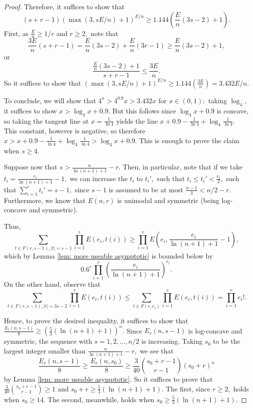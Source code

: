\documentclass{article}
\theoremstyle{definition}
\theoremstyle{remark}
\begin{document}
\begin{proof}
\par Therefore, it suffices to show that \[(s+r-1)(\max(3, sE/n) + 1)^{E/n} \geq 1.144 (\frac{E}{n}(3s - 2) + 1).\] First, as $\frac{E}{n} \geq 1/r$ and $r \geq 2,$ note that \[\frac{3E}{n}(s+r-1) = \frac{E}{n}(3s - 2) + \frac{E}{n}(3r - 1) \geq \frac{E}{n}(3s - 2) + 1,\] or $$\frac{\frac{E}{n}(3s - 2) + 1}{s + r - 1} \leq \frac{3E}{n}.$$ So it suffices to show that $(\max(3, sE/n) + 1)^{E/n} \geq 1.144(\frac{3E}{n}) = 3.432E/n.$ 
\par To conclude, we will show that $4^x > 4^{0.9}x > 3.432x$ for $x \in (0, 1):$ taking $\log_4,$ it suffices to show $x > \log_4 x + 0.9.$ But this follows since $\log_4 x + 0.9$ is concave, so taking the tangent line at $x = \frac{1}{\ln 4}$ yields the line $x + 0.9 - \frac{1}{\ln 4} + \log_4 \frac{1}{\ln 4}.$ This constant, however is negative, so therefore $x > x + 0.9 - \frac{1}{\ln 4} + \log_4 \frac{1}{\ln 4} > \log_4 x + 0.9.$ This is enough to prove the claim when $s \geq 4.$
\par Suppose now that $s > \frac{n}{\ln (n+1) + 1} - r.$ Then, in particular, note that if we take $t_i = \frac{e_i}{\ln(n+1) + 1} - 1,$ we can increase the $t_i$ to $t_i',$ such that $t_i \leq t_i' < \frac{e_i}{2},$ such that $\sum\limits_{i=1}^r t_i' = s-1,$ since $s-1$ is assumed to be at most $\frac{n-1}{3} < n/2 - r.$ Furthermore, we know that $E(n, r)$ is unimodal and symmetric (being log-concave and symmetric).
\par Thus, \[\sum\limits_{t \in F(r, s-1), |t| = s-1} \prod\limits_{i=1}^r E(e_i, t(i)) \geq \prod\limits_{i=1}^r E(e_i, \frac{e_i}{\ln(n+1) + 1} - 1),\] which by Lemma \ref{lem: more useable asymptotic} is bounded below by \[0.6^r \prod\limits_{i=1}^r \left(\frac{e_i}{\ln(n+1) + 1}\right)^{e_i}.\] On the other hand, observe that \[\sum\limits_{t \in F(r, s-1), |t| = 3s-2} \prod\limits_{i=1}^r E(e_i, t(i)) \leq \sum\limits_{t \in F(r, e_i)} \prod\limits_{i=1}^r E(e_i, t(i)) = \prod\limits_{i=1}^r e_i!.\]
\par Hence, to prove the desired inequality, it suffices to show that $\frac{E_r(n, s-1)}{8} \geq \left(\frac{5}{3}\left(\ln(n+1) + 1\right)\right)^n.$ Since $E_r(n, s-1)$ is log-concave and symmetric, the sequence with $s = 1, 2, \ldots, n/2$ is increasing. Taking $s_0$ to be the largest integer smaller than $\frac{n}{\ln (n+1) + 1} - r,$ we see that \[\frac{E_r(n, s-1)}{8} \geq \frac{E_r(n, s_0)}{8} \geq \frac{3}{40} \binom{s_0 + r - 1}{r-1} (s_0 + r)^n\] by Lemma \ref{lem: more useable asymptotic}. So it suffices to prove that $\frac{3}{40} \binom{s_0 + r - 1}{r-1} \geq 1$ and $s_0 + r \geq \frac{5}{3}\left(\ln(n+1) + 1\right).$ The first, since $r \geq 2,$ holds when $s_0 \geq 14.$ The second, meanwhile, holds when $s_0 \geq \frac{5}{3} \left(\ln(n+1) + 1\right).$ 

\end{proof}
\end{document}
